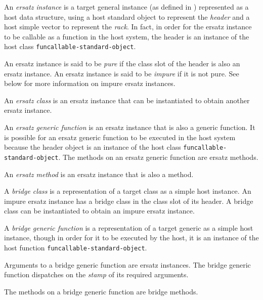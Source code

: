 \begin{definition}
An \emph{ersatz instance} is a target general instance (as defined in
) represented as a
host data structure, using a host standard object to represent the
\emph{header} and a host simple vector to represent the \emph{rack}.
In fact, in order for the ersatz instance to be callable as a function
in the host system, the header is an instance of the host class
\texttt{funcallable-standard-object}.
\end{definition}

\begin{definition}
An ersatz instance is said to be \emph{pure} if the class slot of the
header is also an ersatz instance.  An ersatz instance is said to be
\emph{impure} if it is not pure.  See below for more information on
impure ersatz instances.
\end{definition}

\begin{definition}
An \emph{ersatz class} is an ersatz instance that can be instantiated
to obtain another ersatz instance.
\end{definition}

\begin{definition}
An \emph{ersatz generic function} is an ersatz instance that is also a
generic function.  It is possible for an ersatz generic function to be
executed in the host system because the header object is an instance
of the host class \texttt{funcallable-standard-object}.  The methods
on an ersatz generic function are ersatz methods.
\end{definition}

\begin{definition}
An \emph{ersatz method} is an ersatz instance that is also a method.
\end{definition}

\begin{definition}
A \emph{bridge class} is a representation of a target class as a
simple host instance.  An impure ersatz instance has a bridge class in
the class slot of its header.  A bridge class can be instantiated to
obtain an impure ersatz instance.
\end{definition}

\begin{definition}
A \emph{bridge generic function} is a representation of a target
generic as a simple host instance, though in order for it to be
executed by the host, it is an instance of the host function
\texttt{funcallable-standard-object}.

Arguments to a bridge generic function are ersatz instances.  The
bridge generic function dispatches on the
\emph{stamp}
 of
its required arguments.

The methods on a bridge generic function are bridge methods.
\end{definition}


